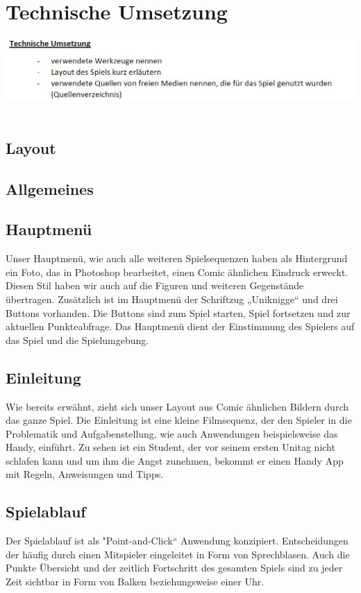 \documentclass[a4paper, 11pt]{article} %
\begin{document}
\section{Technische Umsetzung}
\includegraphics[scale=0.5]{images/umsetzung.png}\\\\
\subsection{Layout}
\subsection{Allgemeines}
\subsection{Hauptmenü}
Unser Hauptmenü, wie auch alle weiteren Spielsequenzen haben als Hintergrund ein Foto, das in Photoshop bearbeitet, einen Comic ähnlichen Eindruck erweckt. Diesen Stil haben wir auch auf die Figuren und weiteren Gegenstände übertragen.
Zusätzlich ist im Hauptmenü der Schriftzug „Uniknigge“ und drei Buttons vorhanden. Die Buttons sind zum Spiel starten, Spiel fortsetzen und zur aktuellen Punkteabfrage. Das Hauptmenü dient der Einstimmung des Spielers auf das Spiel und die Spielumgebung.

\subsection{Einleitung}
Wie bereits erwähnt, zieht sich unser Layout aus Comic ähnlichen Bildern durch das ganze Spiel. Die Einleitung ist eine kleine Filmsequenz, der den Spieler in die Problematik und Aufgabenstellung, wie auch Anwendungen beispielsweise das Handy, einführt. Zu sehen ist ein Student, der vor seinem ersten Unitag nicht schlafen kann und um ihm die Angst zunehmen, bekommt er einen Handy App mit Regeln, Anweisungen und Tipps.

\subsection{Spielablauf}
Der Spielablauf ist als "Point-and-Click“ Anwendung konzipiert. Entscheidungen der häufig durch einen Mitspieler eingeleitet in Form von Sprechblasen.
Auch die Punkte Übersicht und der zeitlich Fortschritt des gesamten Spiels sind zu jeder Zeit sichtbar in Form von Balken beziehungsweise einer Uhr.
\end{document}
